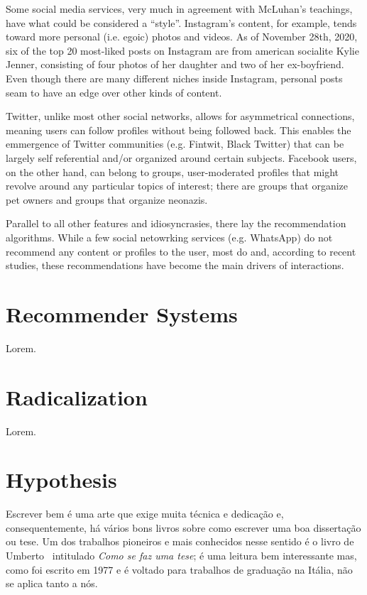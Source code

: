 Some social media services, very much in agreement with McLuhan's teachings,
have what could be considered a ``style''. Instagram's content, for example,
tends toward more personal (i.e. egoic) photos and videos. As of November 28th,
2020, six of the top 20 most-liked posts on Instagram are from american
socialite Kylie Jenner, consisting of four photos of her daughter and two of her
ex-boyfriend. Even though there are many different niches inside Instagram,
personal posts seam to have an edge over other kinds of content.

Twitter, unlike most other social networks, allows for asymmetrical connections,
meaning users can follow profiles without being followed back. This enables the
emmergence of Twitter communities (e.g. Fintwit, Black Twitter) that can be
largely self referential and/or organized around certain subjects. Facebook
users, on the other hand, can belong to groups, user-moderated profiles that
might revolve around any particular topics of interest; there are groups that
organize pet owners and groups that organize neonazis.

Parallel to all other features and idiosyncrasies, there lay the recommendation
algorithms. While a few social netowrking services (e.g. WhatsApp) do not
recommend any content or profiles to the user, most do and, according to recent
studies, these recommendations have become the main drivers of interactions.

\section{Recommender Systems}
\label{sec:recommender_systems}

Lorem.

\section{Radicalization}
\label{sec:extremism}

Lorem.

\section{Hypothesis}
\label{sec:hypothesis}

Escrever bem é uma arte que exige muita técnica e dedicação e,
consequentemente, há vários bons livros sobre como escrever uma boa
dissertação ou tese. Um dos trabalhos pioneiros e mais conhecidos nesse
sentido é o livro de
Umberto~\citet{eco:09} %
intitulado \emph{Como se faz uma tese}; é uma leitura bem interessante mas,
como foi escrito em 1977 e é voltado para trabalhos de graduação na Itália,
não se aplica tanto a nós.

